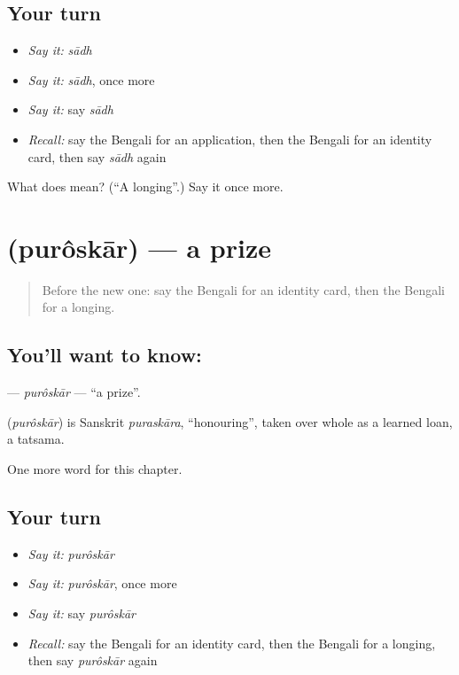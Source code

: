 \subsection*{Your turn}
\begin{itemize}
\raggedright
  \item \emph{Say it:} \emph{sādh}
  \item \emph{Say it:} \emph{sādh}, once more
  \item \emph{Say it:} say \emph{sādh}
  \item \emph{Recall:} say the Bengali for an application, then the Bengali for an identity card, then say \emph{sādh} again
\end{itemize}

\begin{tcolorbox}[breakable,colback=teal!4,colframe=teal!35!black,title={Before you move on}]
What does  mean? (\textquotedblleft{}A longing\textquotedblright{}.) Say it once more.
\end{tcolorbox}
\section[\texorpdfstring{\bn{পুরস্কার} (purôskār)}{পুরস্কার (purôskār)}]{ (purôskār) — a prize}

\label{lesson:BN-C260-puroskar}



\begin{quote}
Before the new one: say the Bengali for an identity card, then the Bengali for a longing.
\end{quote}

\subsection*{You'll want to know: }
\textbf{} — \emph{purôskār} — \textquotedblleft{}a prize\textquotedblright{}.

\begin{cousinweb}
\textbf{} (\emph{purôskār}) is Sanskrit \emph{puraskāra}, \textquotedblleft{}honouring\textquotedblright{}, taken over whole as a learned loan, a tatsama.
\end{cousinweb}

\begin{grammarlens}[title={What you've built}]
One more word for this chapter.
\end{grammarlens}

\subsection*{Your turn}
\begin{itemize}
\raggedright
  \item \emph{Say it:} \emph{purôskār}
  \item \emph{Say it:} \emph{purôskār}, once more
  \item \emph{Say it:} say \emph{purôskār}
  \item \emph{Recall:} say the Bengali for an identity card, then the Bengali for a longing, then say \emph{purôskār} again
\end{itemize}

